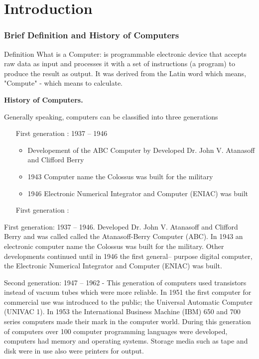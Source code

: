 \section{Introduction} 
\begin{frame}
\frametitle{Brief Definition and History of Computers}
\begin{exampleblock}{Definition}
	What is a Computer: is programmable electronic device that accepts raw data as input and processes it with a set of instructions (a program) to produce the result as output. It was derived from the Latin word which means, "Compute" - which means to calculate. 
\end{exampleblock}
\begin{large}
	\textbf{History of Computers.}
\end{large}

Generally speaking, computers can be classified into three generations\\
\begin{itemize}
	\item [First generation : 1937 – 1946]
		\begin{itemize}
			\item Developement of the ABC Computer by Developed Dr. John V. Atanasoff and Clifford Berry
			\item 1943 Computer name the Colossus was built for the military
			\item 1946 Electronic Numerical Integrator and Computer (ENIAC) was built
		\end{itemize}
	\item [First generation : ]
\end{itemize}


First generation: 1937 – 1946. Developed Dr. John V. Atanasoff and Clifford Berry and was called called the Atanasoff-Berry Computer (ABC). In 1943 an electronic computer name the Colossus was built for the military. Other developments continued until in 1946 the first general– purpose digital computer, the Electronic Numerical Integrator and Computer (ENIAC) was built.

Second generation: 1947 – 1962 - This generation of computers used transistors instead of vacuum tubes which were more reliable. In 
1951 the first computer for commercial use was introduced to the public; the Universal Automatic Computer (UNIVAC 1). In 1953 the International Business Machine (IBM) 650 and 700 series computers made their mark in the computer world. During this generation of computers over 100 computer programming languages were developed, computers had memory and operating systems. Storage media such as tape and disk were in use also were printers for output.


\end{frame}
